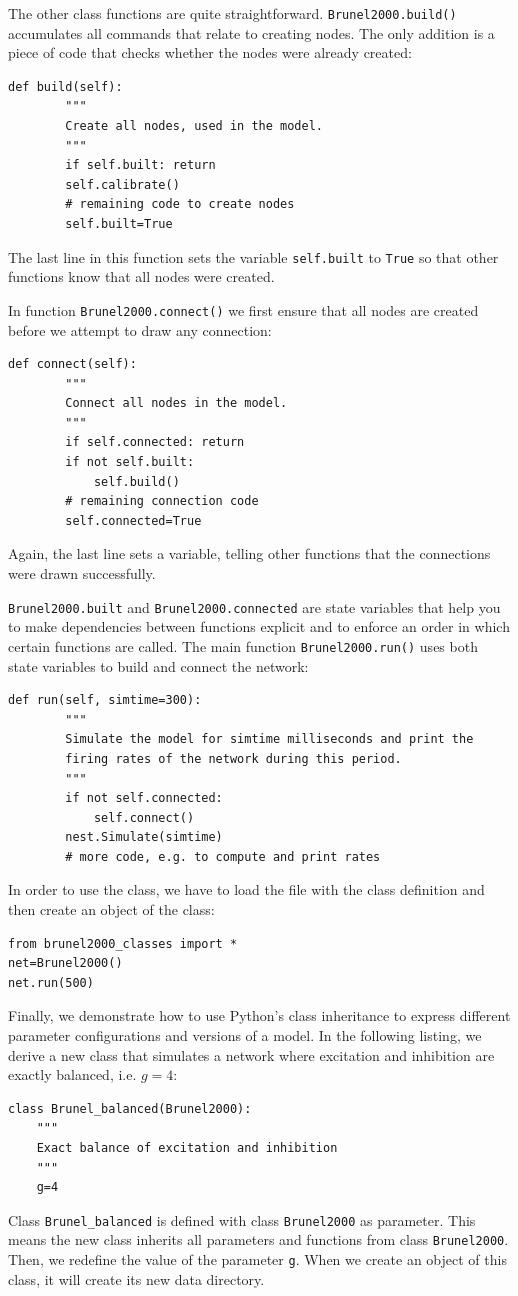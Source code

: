 \documentclass{article}
\begin{document}
The other class functions are quite straightforward. 
\lstinline!Brunel2000.build()! accumulates all commands that
relate to creating nodes. The only addition is a piece of code that
checks whether the nodes were already created:
\begin{lstlisting}[name=brunel-classes]
    def build(self):
        """
        Create all nodes, used in the model.
        """
        if self.built: return
        self.calibrate()
        # remaining code to create nodes
        self.built=True
\end{lstlisting}  
The last line in this function sets the variable
\lstinline!self.built! to \lstinline!True! so that other functions
know that all nodes were created.

In function \lstinline!Brunel2000.connect()! we first ensure that all nodes are
created before we attempt to draw any connection:
\begin{lstlisting}[name=brunel-classes]
    def connect(self):
        """
        Connect all nodes in the model.
        """
        if self.connected: return
        if not self.built:
            self.build()
        # remaining connection code
        self.connected=True
\end{lstlisting}
Again, the last line sets a variable, telling other functions that the
connections were drawn successfully.

\lstinline!Brunel2000.built! and \lstinline!Brunel2000.connected! are
state variables that help you to make dependencies between functions
explicit and to enforce an order in which certain functions are
called. The main function \lstinline!Brunel2000.run()! uses both
state variables to build and connect the network:
\begin{lstlisting}[name=brunel-classes]
    def run(self, simtime=300):
        """
        Simulate the model for simtime milliseconds and print the
        firing rates of the network during this period.  
        """
        if not self.connected:
            self.connect()
        nest.Simulate(simtime)
        # more code, e.g. to compute and print rates
\end{lstlisting}
In order to use the class, we have to load the file with the class
definition and then create an object of the class:
\begin{lstlisting}[numbers=none]
from brunel2000_classes import *
net=Brunel2000()
net.run(500)
\end{lstlisting} 
Finally, we demonstrate how to use Python's class inheritance to
express different parameter configurations and versions of a model.
In the following listing, we derive a new class that simulates a
network where excitation and inhibition are exactly balanced,
i.e. $g=4$:
\begin{lstlisting}[name=brunel-classes]
class Brunel_balanced(Brunel2000):
    """
    Exact balance of excitation and inhibition
    """
    g=4
\end{lstlisting}
Class \lstinline!Brunel_balanced! is defined with class
\lstinline!Brunel2000! as parameter. This means the new class inherits
all parameters and functions from class \lstinline!Brunel2000!. Then,
we redefine the value of the parameter \lstinline!g!. When we create
an object of this class, it will create its new data directory. 
\end{document}

